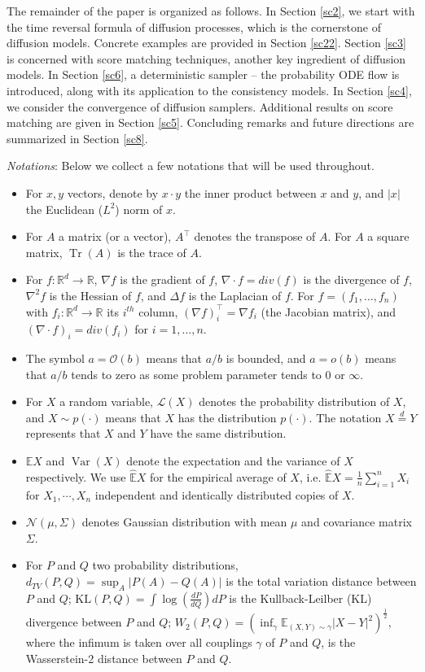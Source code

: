 \documentclass[letterpaper,11pt,reqno]{amsart}
\DeclareMathOperator\tr{Tr}
\DeclareMathOperator\var{Var}
\numberwithin{equation}{section}
\begin{document}
\quad The remainder of the paper is organized as follows. 
In Section \ref{sc2}, we start with the time reversal formula of diffusion processes,
which is the cornerstone of diffusion models.
Concrete examples are provided in Section \ref{sc22}.
Section \ref{sc3} is concerned with score matching techniques,
another key ingredient of diffusion models.
In Section \ref{sc6},
a deterministic sampler -- the probability ODE flow is introduced,
along with its application to the consistency models.
In Section \ref{sc4},
we consider the convergence of diffusion samplers.
Additional results on score matching are given in Section \ref{sc5}.
Concluding remarks and future directions 
are summarized in Section \ref{sc8}.

\medskip
\noindent
{\em Notations}: Below we collect a few notations that will be used throughout.
\begin{itemize}[itemsep = 3 pt]
\item
For $x, y$ vectors, denote by $x \cdot y$ the inner product between $x$ and $y$,
and $|x|$ the Euclidean ($L^2$) norm of $x$.
\item
For $A$ a matrix (or a vector), $A^\top$ denotes the transpose of $A$.
For $A$ a square matrix, $\tr(A)$ is the trace of $A$.
\item
For $f: \mathbb{R}^d \to \mathbb{R}$, $\nabla f$ is the gradient of $f$,  $\nabla \cdot f = div (f)$ is the divergence of $f$,
$\nabla^2 f$ is the Hessian of $f$,
and $\Delta f$ is the Laplacian of $f$.
For $f = (f_1, \ldots, f_n)$ with $f_i: \mathbb{R}^d \to \mathbb{R}$ its $i^{th}$ column,
$(\nabla f)^\top_i = \nabla f_i$ (the Jacobian matrix),
and 
$(\nabla \cdot f)_i = div(f_i)$ for $i = 1, \ldots, n$.
\item
The symbol $a = \mathcal{O}(b)$ means that $a/b$ is bounded,
and $a = o(b)$ means that $a/b$ tends to zero
as some problem parameter tends to $0$ or $\infty$.
\item
For $X$ a random variable, $\mathcal{L}(X)$ denotes the probability distribution of $X$,
and $X \sim p(\cdot)$ means that $X$ has the distribution $p(\cdot)$.
The notation $X \stackrel{d}{=} Y$ represents that $X$ and $Y$ have the same distribution.
\item
$\mathbb{E}X$ and $\var(X)$ denote the expectation and the variance of $X$ respectively.
We use $\widehat{\mathbb{E}}X$ for the empirical average of $X$, i.e. 
$\widehat{\mathbb{E}}X = \frac{1}{n} \sum_{i= 1}^n X_i$ for $X_1, \cdots, X_n$ independent and
identically distributed copies of $X$.
\item
$\mathcal{N}(\mu, \Sigma)$ denotes Gaussian distribution with mean $\mu$
and covariance matrix $\Sigma$.
\item
For $P$ and $Q$ two probability distributions, 
$d_{TV}(P,Q) = \sup_A|P(A) - Q(A)|$ is the total variation distance between $P$ and $Q$;
$\mbox{KL}(P,Q) = \int \log \left(\frac{dP}{dQ} \right)dP$ is the Kullback-Leilber (KL) divergence between $P$ and $Q$;
$W_2(P,Q) = \left(\inf_\gamma \mathbb{E}_{(X,Y) \sim \gamma} |X - Y|^2 \right)^{\frac{1}{2}}$,
where the infimum is taken over all couplings $\gamma$ of $P$ and $Q$,
is the Wasserstein-2 distance between $P$ and $Q$.
\end{itemize}
\end{document}
